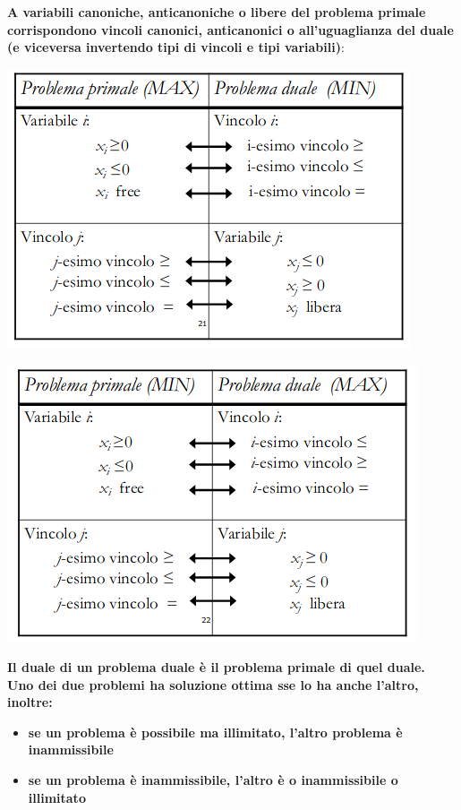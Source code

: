 \documentclass[a4paper,12pt, oneside]{book}
\begin{document}
\textbf{A variabili canoniche, anticanoniche o libere del problema
  primale corrispondono vincoli canonici, anticanonici o
  all'uguaglianza del duale (e viceversa invertendo tipi di vincoli e
  tipi variabili)}:
\begin{center}
  \includegraphics[scale = 0.7]{img/dua2.png}
\end{center}
\begin{center}
  \includegraphics[scale = 0.7]{img/dua3.png}
\end{center}
\textbf{Il duale di un problema duale è il problema primale di quel
  duale.}\\
\textbf{Uno dei due problemi ha soluzione ottima sse lo ha anche
  l'altro, inoltre:}
\begin{itemize}
  \item \textbf{se un problema è possibile ma illimitato, l’altro
    problema è inammissibile}
  \item \textbf{se un problema è inammissibile, l’altro è o
    inammissibile o illimitato}
\end{itemize}
\end{document}
